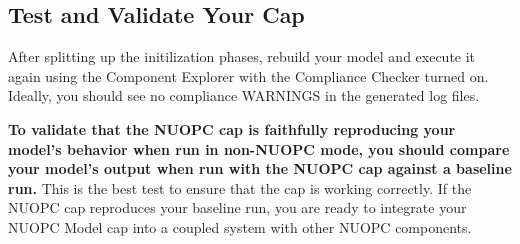 \subsection{Test and Validate Your Cap}
\label{sec:validatecap}
After splitting up the initilization phases, rebuild your model and execute it again using
the Component Explorer with the Compliance Checker turned on.  Ideally, you
should see no compliance WARNINGS in the generated log files.

\textbf{To validate that the NUOPC cap is faithfully reproducing your model's
behavior when run in non-NUOPC mode, you should compare your model's
output when run with the NUOPC cap against a baseline run.}
This is the best test to ensure that the cap is working correctly.
If the NUOPC cap reproduces your baseline run, you are ready to integrate
your NUOPC Model cap into a coupled system with other NUOPC components.
